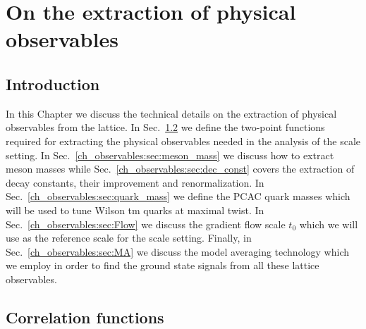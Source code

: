 \chapter{On the extraction of physical observables}%


\label{ch_observables}


\section{Introduction}
\label{ch_observables:sec:general}

In this Chapter we discuss the technical details on the extraction of physical observables from the lattice. In Sec.~\ref{ch_observables:sec:correlators} we define the two-point functions required for extracting the physical observables needed in the analysis of the scale setting. In Sec.~\ref{ch_observables:sec:meson_mass} we discuss how to extract meson masses while Sec.~\ref{ch_observables:sec:dec_const} covers the extraction of decay constants, their improvement and renormalization. In  Sec.~\ref{ch_observables:sec:quark_mass} we define the PCAC quark masses which will be used to tune Wilson tm quarks at maximal twist. In Sec.~\ref{ch_observables:sec:Flow} we discuss the gradient flow scale $t_0$ which we will use as the reference scale for the scale setting. Finally, in Sec.~\ref{ch_observables:sec:MA} we discuss the model averaging technology which we employ in order to find the ground state signals from all these lattice observables.


\section{Correlation functions}
\label{ch_observables:sec:correlators}

